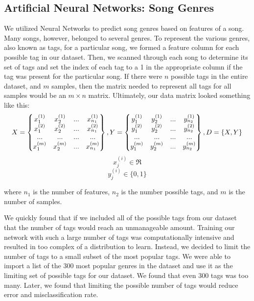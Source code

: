 \documentclass[12pt]{article}
\begin{document}
\subsection{Artificial Neural Networks: Song Genres}
\label{subsec:ann}
We utilized Neural Networks to predict song genres based on features of a song. Many songs, however, belonged to several genres. To represent the various genres, also known as tags, for a particular song, we formed a feature column for each possible tag in our dataset. Then, we scanned through each song to determine its set of tags and set the index of each tag to a 1 in the appropriate column if the tag was present for the particular song. If there were $n$ possible tags in the entire dataset, and $m$ samples, then the matrix needed to represent all tags for all samples would be an $m \times n$ matrix. Ultimately, our data matrix looked something like this:
\begin{equation}
    X = \begin{Bmatrix}
    	x^{(1)}_1 & x^{(1)}_2 & ... & x^{(1)}_{n_1} \\
    	x^{(2)}_1 & x^{(2)}_2 & ... & x^{(2)}_{n_1} \\
    	...       & ...       & ... & ... \\
        x^{(m)}_1 & x^{(m)}_2 & ... & x^{(m)}_{n_1} \\
    \end{Bmatrix},
    \\
    Y = \begin{Bmatrix}
    y^{(1)}_1 & y^{(1)}_2 & ... & y^{(1)}_{n_2} \\
    y^{(2)}_1 & y^{(2)}_2 & ... & y^{(2)}_{n_2} \\
    ...       & ...       & ... & ... \\
    y^{(m)}_1 & y^{(m)}_2 & ... & y^{(m)}_{n_2} \\
    \end{Bmatrix},
    \\
    D = \{X,Y\}
\end{equation} 
\begin{equation}
    x^{(i)}_j \in \Re
\end{equation}
\begin{equation}
    y^{(i)}_j \in \{0, 1\}
\end{equation}

where $n_1$ is the number of features, $n_2$ is the number possible tags, and $m$ is the number of samples.

We quickly found that if we included all of the possible tags from our dataset that the number of tags would reach an unmanageable amount. Training our network with such a large number of tags was computationally intensive and resulted in too complex of a distribution to learn. Instead, we decided to limit the number of tags to a small subset of the most popular tags. We were able to import a list of the 300 most popular genres in the dataset and use it as the limiting set of possible tags for our dataset. We found that even 300 tags was too many. Later, we found that limiting the possible number of tags would reduce error and misclassification rate.
\end{document}
